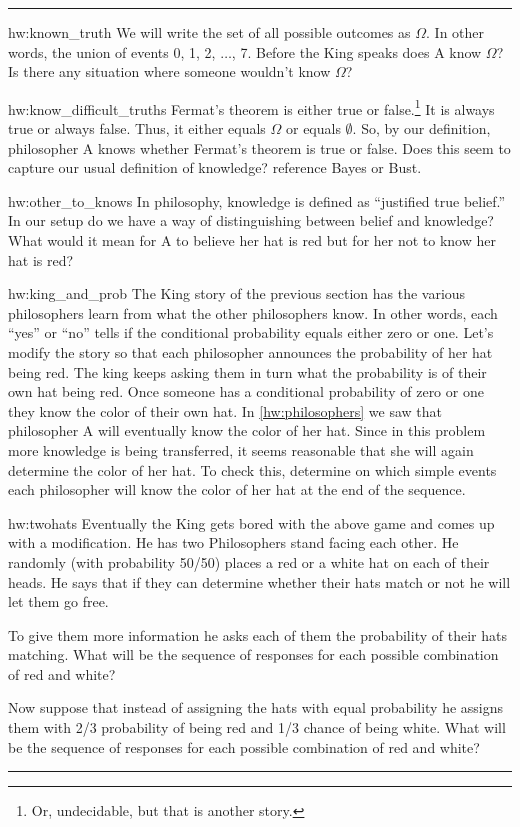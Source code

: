 \documentclass[14pt]{extarticle}
\newenvironment{textHW}{
  \noindent\rule{\textwidth}{1pt}%
  \begin{list}{}{
      \setlength{\labelwidth}{1cm}
      \setlength{\labelsep}{0.3cm}
      \setlength{\leftmargin}{1.3cm}
      \setlength{\rightmargin}{1cm}
      \setlength{\parsep}{0.5ex plus0.2ex minus0.1ex}
      \setlength{\topsep}{1pt plus3pt minus1pt}
      \setlength{\itemsep}{0ex plus0.2ex} 
      \renewcommand{\makelabel}[1]{\label{thw:##1}{\ref{##1}}}
      \sl}}%
  {\end{list}\rule{\textwidth}{1pt}}
\newcommand{\notes}{}
\begin{document}
\begin{textHW}
\item[hw:known_truth] We will write the set of all possible outcomes
  as $\Omega$.  In other words, the union of events 0, 1, 2,
  $\ldots$, 7.  Before the King speaks does A know $\Omega$?  Is
  there any situation where someone wouldn't know $\Omega$?
\item[hw:know_difficult_truths] Fermat's theorem is either true or
  false.\footnote{Or, undecidable, but that is another story.}  It is
  always true or always false.  Thus, it either equals $\Omega$ or
  equals $\emptyset$.  So, by our definition, philosopher A knows
  whether Fermat's theorem is true or false.  Does this seem to
  capture our usual definition of knowledge? {\notes reference Bayes or
    Bust.}
\item[hw:other_to_knows] In philosophy, knowledge is defined as
  ``justified true belief.''  In our setup do we have a way of
  distinguishing between belief and knowledge?  What would it mean for
  A to believe her hat is red but for her not to know her hat is red? 

\item[hw:king_and_prob]  The King story of the previous section has
  the various philosophers learn from what the other philosophers
  know. In other words, each ``yes'' or ``no'' tells if the
  conditional probability equals either zero or one.  Let's modify the
  story so that each philosopher announces the probability of her hat
  being red.  The king keeps asking them in turn what the probability
  is 
  of their own hat being red.  Once someone has a conditional
  probability of zero or one they know the color of their own hat.  In
  \ref{hw:philosophers} we saw that  philosopher A will eventually
  know the color of her hat.  Since in this problem more knowledge is
  being transferred, it seems reasonable that she will again determine
  the color of her hat.  To check this, determine on which simple
  events each philosopher will know the color of her hat at the end of
  the sequence.  

\item[hw:twohats] Eventually the King gets bored with the above game
  and comes up with a modification.  He has two Philosophers stand
  facing each other.  He randomly (with probability 50/50) places a
  red or a white hat on each of their heads.  He says that if they can
  determine whether their hats match or not he will let them go free.
  
  To give them more information he asks each of them the probability
  of their hats matching.  What will be the sequence of responses for
  each possible combination of red and white?

  Now suppose that instead of assigning the hats with equal
  probability he assigns them with 2/3 probability of being red and
  1/3 chance of being white.  What will be the sequence of responses
  for each possible combination of red and white?

\end{textHW}
 
\end{document}

